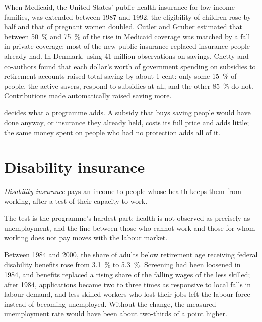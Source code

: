 \begin{record}
When Medicaid, the United States' public health insurance for low-income families,
was extended between 1987 and 1992, the eligibility of children rose by half and
that of pregnant women doubled. Cutler and Gruber estimated that between 50~\% and
75~\% of the rise in Medicaid coverage was matched by a fall in private coverage:
most of the new public insurance replaced insurance people already had.
In Denmark, using 41 million observations on savings, Chetty and co-authors found
that each dollar's worth of government spending on subsidies to retirement accounts
raised total saving by about 1 cent: only some 15~\% of people, the active savers,
respond to subsidies at all, and the other 85~\% do not. Contributions made
automatically raised saving more.
\end{record}

 decides what a programme adds. A subsidy that buys saving people would
have done anyway, or insurance they already held, costs its full price and adds
little; the same money spent on people who had no protection adds all of it.

\section{Disability insurance}\label{sec:b3:social-insurance:disability}

\begin{definition}\label{def:b3:social-insurance:disability}
\emph{Disability insurance} pays an income to people whose health keeps them from
working, after a test of their capacity to work.
\end{definition}

The test is the programme's hardest part: health is not observed as precisely as
unemployment, and the line between those who cannot work and those for whom
working does not pay moves with the labour market.

\begin{record}
Between 1984 and 2000, the share of adults below retirement age receiving federal
disability benefits rose from 3.1~\% to 5.3~\%. Screening had been loosened in 1984, and
benefits replaced a rising share of the falling wages of the less skilled; after
1984, applications became two to three times as responsive to local falls in labour
demand, and less-skilled workers who lost their jobs left the labour force
instead of becoming unemployed. Without the change, the measured unemployment
rate would have been about two-thirds of a point higher. %
\end{record}

